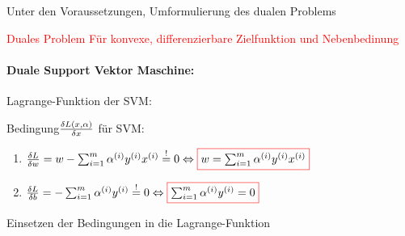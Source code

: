			
			Unter den Voraussetzungen, Umformulierung des dualen Problems\\
			
			
			\begin{minipage}[]{0.45\linewidth}
				\begin{center}
				\end{center}
			\end{minipage}
			\hfill
			\begin{minipage}[]{0.45\linewidth}
				\textcolor{red}{Duales Problem Für konvexe, differenzierbare Zielfunktion und Nebenbedinung}
			\end{minipage}
			
			
		\paragraph*{Duale Support Vektor Maschine:}
			
			Lagrange-Funktion der SVM:
			\begin{center}
			\end{center}
			
			Bedingung$ \frac{\delta L(x,\alpha)}{\delta x} $ für SVM:\\
			\begin{enumerate}[1.]
				\item $ \frac{\delta L}{\delta w} = w - \sum_{i=1}^{m}\vi{\alpha}{i}\vi{y}{i}\vi{x}{i} \overset{!}{=} 0 \Leftrightarrow \cfbox{red}{$ w = \sum_{i=1}^{m}\vi{\alpha}{i}\vi{y}{i}\vi{x}{i} $}$
				\item $\frac{\delta L}{\delta b} = - \sum_{i=1}^{m} \vi{\alpha}{i}\vi{y}{i} \overset{!}{=} 0 \Leftrightarrow \cfbox{red}{$ \sum_{i=1}^{m}\vi{\alpha}{i}\vi{y}{i} = 0 $}$
			\end{enumerate}
			
			Einsetzen der Bedingungen in die Lagrange-Funktion
			
